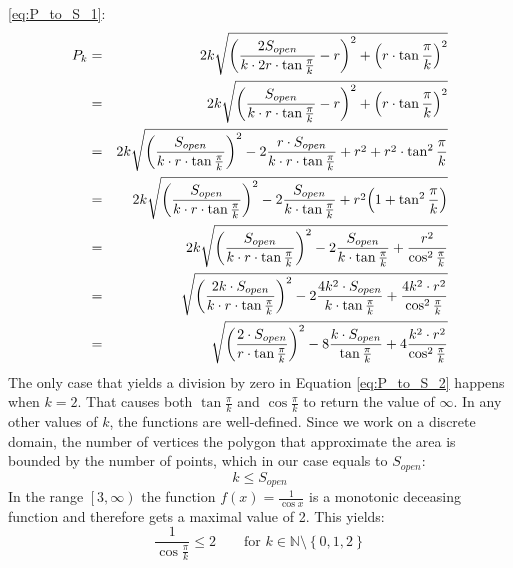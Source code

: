 \eqref{eq:P_to_S_1}:
\begin{eqnarray}\label{eq:P_to_S_2}
P_k &=& 2k\sqrt{{\left(\frac{2S_{open}}{k\cdot 2r\cdot\tan{\frac{\pi}{k}}} - r\right)}^2 +
 {\left(r\cdot\tan{\frac{\pi}{k}}\right)}^2} \nonumber \\
&=& 2k\sqrt{{\left(\frac{S_{open}}{k\cdot r\cdot\tan{\frac{\pi}{k}}} - r\right)}^2 +
 {\left(r\cdot\tan{\frac{\pi}{k}}\right)}^2} \nonumber\\
&=& 2k\sqrt{{\left(\frac{S_{open}}{k\cdot r\cdot\tan{\frac{\pi}{k}}}\right)}^2
	       -2\frac{r\cdot S_{open}}{k\cdot r\cdot\tan{\frac{\pi}{k}}}
	       + r^2 + 
 r^2\cdot\tan^2{\frac{\pi}{k}}} \nonumber\\
 &=& 2k\sqrt{{\left(\frac{S_{open}}{k\cdot r\cdot\tan{\frac{\pi}{k}}}\right)}^2
	       -2\frac{S_{open}}{k\cdot\tan{\frac{\pi}{k}}}
	       + r^2{\left(1+\tan^2{\frac{\pi}{k}}\right)}} \nonumber\\
&=& 2k\sqrt{{\left(\frac{S_{open}}{k\cdot r\cdot\tan{\frac{\pi}{k}}}\right)}^2
	       -2\frac{S_{open}}{k\cdot\tan{\frac{\pi}{k}}}
	       + \frac{r^2}{\cos^2{\frac{\pi}{k}}}} \nonumber\\
&=& \sqrt{{\left(\frac{2k\cdot S_{open}}{k\cdot r\cdot\tan{\frac{\pi}{k}}}\right)}^2
	       -2\frac{4k^2\cdot S_{open}}{k\cdot\tan{\frac{\pi}{k}}}
	       + \frac{4k^2\cdot r^2}{\cos^2{\frac{\pi}{k}}}} \nonumber\\
&=& \sqrt{{\left(\frac{2\cdot S_{open}}{r\cdot\tan{\frac{\pi}{k}}}\right)}^2
	       -8\frac{k\cdot S_{open}}{\tan{\frac{\pi}{k}}}
	       + 4\frac{k^2\cdot r^2}{\cos^2{\frac{\pi}{k}}}}
\end{eqnarray} 
The only case that yields a division by zero in Equation \eqref{eq:P_to_S_2}
happens when $k=2$. That causes both $\tan{\frac{\pi}{k}}$ and
$\cos{\frac{\pi}{k}}$ to return the value of $\infty$. In any other values of
$k$, the functions are well-defined. Since we work on a discrete domain, the
number of vertices the polygon that approximate the \openspace area is bounded
by the number of \openspace points, which in our case equals to $S_{open}$:
\begin{equation}\label{eq:bound_k_to_S}
	k \le S_{open}
\end{equation}
In the range $\left[3,\infty\right)$ the function $f(x)=\frac{1}{\cos{x}}$
is a monotonic deceasing function and therefore gets a maximal value of 2. This
yields:
\begin{equation}\label{eq:bound_cosine}
	\frac{1}{\cos{\frac{\pi}{k}}} \le 2 \qquad{ \text{for } k \in
	\mathbb{N}\setminus\left\{0,1,2\right\}}
\end{equation}
